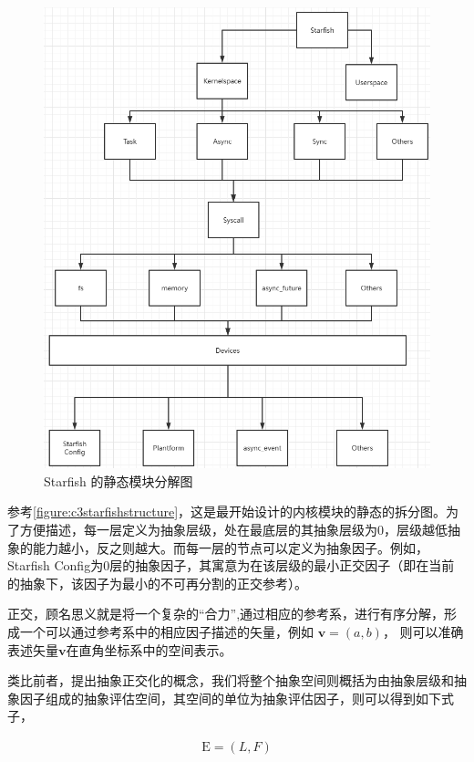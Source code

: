 \begin{figure}[htb]
    \figureCapSet
    \centering
    \includegraphics[width=.8\linewidth]{figure/c3/starfishstructure.png}
    \caption{Starfish 的静态模块分解图}
    \label{figure:c3starfishstructure}
\end{figure}

参考\autoref{figure:c3starfishstructure}，这是最开始设计的内核模块的静态的拆分图。为了方便描述，每一层定义为抽象层级，处在最底层的其抽象层级为0，层级越低抽象的能力越小，反之则越大。而每一层的节点可以定义为抽象因子。例如，Starfish Config为0层的抽象因子，其寓意为在该层级的最小正交因子（即在当前的抽象下，该因子为最小的不可再分割的正交参考）。

正交，顾名思义就是将一个复杂的“合力”,通过相应的参考系，进行有序分解，形成一个可以通过参考系中的相应因子描述的矢量，例如 $\boldsymbol {v}=(a, b)$， 则可以准确表述矢量$\boldsymbol {v}$在直角坐标系中的空间表示。

类比前者，提出抽象正交化的概念，我们将整个抽象空间则概括为由抽象层级和抽象因子组成的抽象评估空间，其空间的单位为抽象评估因子，则可以得到如下式子，


\begin{equation}
    \label{equation:c3elf}
    \begin{aligned}
       \boldsymbol{\mathrm{E}} = (L, F)
    \end{aligned}
\end{equation}

